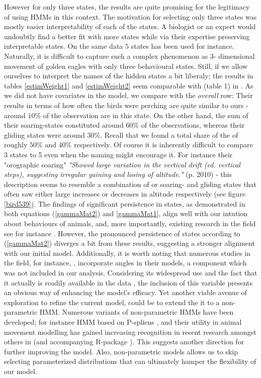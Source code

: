 However for only three states, the results are quite promising for the legitimacy of using HMMs in this context. The motivation for selecting only three states was mostly easier interpretability of each of the states. A biologist or an expert would undoubtly find a better fit with more states while via their expertise preserving interpretable states. On the same data $5$ states has been used \cite{Pirotta2018} for instance. Naturally, it is difficult to capture such a complex phenomenon as 3- dimensional movement of golden eagles with only three behavioural states. Still, if we allow ourselves to interpret the names of the hidden states a bit liberaly; the results in tables \ref{estimWeight1} and \ref{estimWeight2} seem comparable with (table 1) in \cite{Pirotta2018}. As we did not have covariates in the model, we compare with the \textit{overall} row: Their results in terms of how often the birds were perching are quite similar to ours - around $10\%$ of the observation are in this state. On the other hand, the sum of their soaring-states constituted around $60\%$ of the observations, whereas their gliding states were around $30\%$. Recall that we found a total share of the of roughly $50\%$ and $40\%$ respectively. Of course it is inherently difficult to compare 3 states to 5 even when the naming might encourage it. For instance their "orographic soaring" \textit{"Showed large variation in the vertical drift (ed. vertical steps), suggesting irregular gaining and losing of altitude."} \cite{Pirotta2018} (p. 2010) - this description seems to resemble a combination of or soaring- and gliding states that often saw either large increases or decreases in altitude respectively (see figure \ref{bird539}). The findings of significant persistence in states, as demonstrated in both equations (\ref{gammaMat2}) and \ref{gammaMat1}, align well with our intution about behaviours of animals, and, more importantly, existing research in the field see for instance \cite{UncoveringEcologicalState}. However, the pronounced persistence of states according to (\ref{gammaMat2}) diverges a bit from these results, suggesting a stronger alignment with our initial model.
Additionally, it is worth noting that numerous studies in the field, for instance, \cite{Pirotta2018}, incorporate angles in their models, a component which was not included in our analysis. Considering its widespread use and the fact that it actually is readily available in the data \cite{eagleData}, the inclusion of this variable presents an obvious way of enhancing the model's efficacy.
Yet another viable avenue of exploration to refine the current model, could be to extend the it to a non-parametric HMM. Numerous variants of non-parametric HMMs have been developed; for instance HMM based on P-spliens \cite{NonparametricHMM}, and their utility in animal movement modelling has gained increasing recognition in recent research amongst others in \cite{Cullen2021} (and accompanying R-package \cite{bayesmove}). This suggests another direction for further improving the model. Also, non-parametric models allows us to skip selecting parameterized distributions that can ultimately hamper the flexibility of our model.\\
